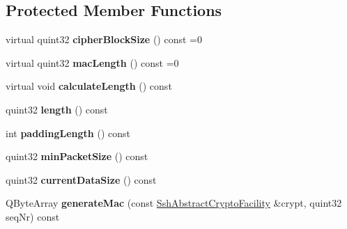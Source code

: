 \subsection*{Protected Member Functions}
\begin{DoxyCompactItemize}
\item 
\mbox{\label{class_q_ssh_1_1_internal_1_1_abstract_ssh_packet_a0aa198711113c9f24a2163921407076d}} 
virtual quint32 {\bfseries cipher\+Block\+Size} () const =0
\item 
\mbox{\label{class_q_ssh_1_1_internal_1_1_abstract_ssh_packet_a5f6dbae0379a565136d51fdfd7a453db}} 
virtual quint32 {\bfseries mac\+Length} () const =0
\item 
\mbox{\label{class_q_ssh_1_1_internal_1_1_abstract_ssh_packet_af1e6c8a2f63564fac4c801cc0d35f1a1}} 
virtual void {\bfseries calculate\+Length} () const
\item 
\mbox{\label{class_q_ssh_1_1_internal_1_1_abstract_ssh_packet_a6a8c63e0cc6a450e9c8e109041602233}} 
quint32 {\bfseries length} () const
\item 
\mbox{\label{class_q_ssh_1_1_internal_1_1_abstract_ssh_packet_a525beb264d63b2adafeb6f4037eb7420}} 
int {\bfseries padding\+Length} () const
\item 
\mbox{\label{class_q_ssh_1_1_internal_1_1_abstract_ssh_packet_a424e9ce5d6713e4a55abcaec68d5f63f}} 
quint32 {\bfseries min\+Packet\+Size} () const
\item 
\mbox{\label{class_q_ssh_1_1_internal_1_1_abstract_ssh_packet_a6e3262a330d909742e801ed85aa1e226}} 
quint32 {\bfseries current\+Data\+Size} () const
\item 
\mbox{\label{class_q_ssh_1_1_internal_1_1_abstract_ssh_packet_ad12e242e00de732c40e47a101be308c8}} 
Q\+Byte\+Array {\bfseries generate\+Mac} (const \mbox{\hyperlink{class_q_ssh_1_1_internal_1_1_ssh_abstract_crypto_facility}{Ssh\+Abstract\+Crypto\+Facility}} \&crypt, quint32 seq\+Nr) const
\end{DoxyCompactItemize}
